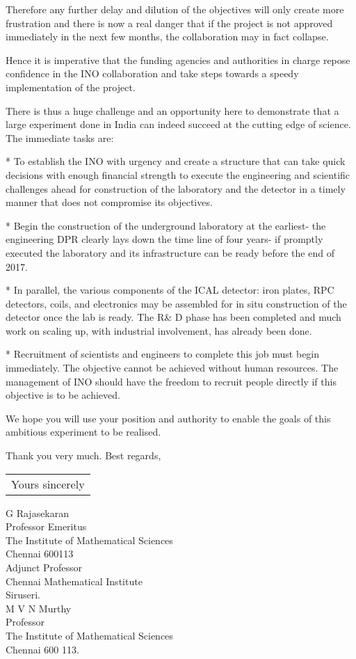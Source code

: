 Therefore any further delay and dilution of the objectives will only
create more frustration and there is now a real danger that if the project
is not approved immediately in the next few months, the collaboration may
in fact collapse.

Hence it is imperative that the funding agencies and authorities in charge
repose confidence in the INO collaboration and take steps towards a speedy
implementation of the project.

There is thus a huge challenge and an opportunity here to demonstrate that
a large experiment done in India can indeed succeed at the cutting edge of
science. The immediate tasks are:

* To establish the INO with urgency and create a structure that can take
quick decisions with enough financial strength to execute the engineering
and scientific challenges ahead for construction of the laboratory and the
detector in a timely manner that does not compromise its objectives.

* Begin the construction of the underground laboratory at the earliest-
the engineering DPR clearly lays down the time line of four years- if
promptly executed the laboratory and its infrastructure can be ready
before the end of 2017.

* In parallel, the various components of the ICAL detector: iron plates,
RPC detectors, coils, and electronics may be assembled for in situ
construction of the detector once the lab is ready. The R\& D phase has
been completed and much work on scaling up, with industrial involvement,
has already been done.

* Recruitment of scientists and engineers to complete this job must begin
immediately. The objective cannot be achieved without human resources.
The management of INO should have the freedom to recruit people directly
if this objective is to be achieved.

We hope you will use your position and authority to enable the goals of
this ambitious experiment to be realised.

Thank you very much. Best regards,

\begin{flushright}
\begin{tabular}{c}
Yours sincerely \phantom{WWW} 
\end{tabular}
\end{flushright}
\bigskip

\begin{flushleft}
G Rajasekaran\\
Professor Emeritus\\
The Institute of Mathematical Sciences\\
Chennai 600113\\
Adjunct Professor\\
Chennai Mathematical Institute\\
Siruseri.\\
\vskip 1cm 
M V N Murthy\\
Professor\\
The Institute of Mathematical Sciences\\
Chennai 600 113.\\
\end{flushleft}

